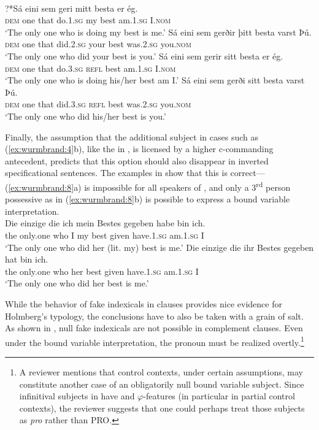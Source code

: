 \documentclass[output=paper]{LSP/langsci}
\begin{document}
\ea  \label{ex:wurmbrand:7}
\\
\ea
\gll  ?*Sá eini  sem  geri  mitt  besta  er  ég.\\
\textsc{dem} one  that  do.1.\textsc{sg}  my  best  am.1.\textsc{sg} I.\textsc{nom}\\
\glt ‘The only one who is doing my best is me.’
\ex
\gll  *Sá eini  sem  gerðir  þitt  besta  varst  Þú.\\
\textsc{dem} one  that  did.2.\textsc{sg}  your  best  was.2.\textsc{sg} you.\textsc{nom}\\
\glt  ‘The only one who did your best is you.’
\ex
\gll  Sá eini  sem  gerir  sitt  besta  er  ég.\\
\textsc{dem} one  that  do.3.\textsc{sg}  \textsc{refl}  best  am.1.\textsc{sg} I.\textsc{nom}\\
\glt  ‘The only one who is doing his/her best am I.’
\ex
\gll  Sá eini  sem  gerði  sitt  besta  varst  Þú.\\
\textsc{dem} one  that  did.3.\textsc{sg}  \textsc{refl}  best  was.2.\textsc{sg} you.\textsc{nom}\\
\glt  ‘The only one who did his/her best is you.’
\z
\z

Finally, the assumption that the additional subject in  cases such as (\ref{ex:wurmbrand:4}b), like the  in , is licensed by a higher c-commanding antecedent, predicts that this option should also disappear in inverted specificational sentences. The examples in  show that this is correct—(\ref{ex:wurmbrand:8}a) is impossible for all speakers of , and only a 3\textsuperscript{rd} person possessive as in (\ref{ex:wurmbrand:8}b) is possible to express a bound variable interpretation.
\newpage
\ea  \label{ex:wurmbrand:8}
 \\
\ea
\gll  *Die einzige  die  ich  mein Bestes  gegeben  habe  bin  ich.\\
the only.one  who  I  my best  given  have.1.\textsc{sg}  am.1.\textsc{sg}  I\\
\glt ‘The only one who did her (lit. my) best is me.’
\ex
\gll  Die einzige  die    ihr Bestes  gegeben  hat  bin  ich.\\
the only.one  who    her best  given  have.1.\textsc{sg}  am.1.\textsc{sg}  I\\
\glt  ‘The only one who did her best is me.’
\z
\z

While the behavior of fake indexicals in  clauses provides nice evidence for Holmberg’s  typology, the conclusions have to also be taken with a grain of salt. As shown in , null fake indexicals are not possible in complement clauses. Even under the bound variable interpretation, the pronoun must be realized overtly.\footnote{A reviewer mentions that control contexts, under certain assumptions, may constitute another case of an obligatorily null bound variable subject. Since infinitival subjects in  have  \citep{Sigurðsson1991} and $\varphi $-features (in particular in partial control contexts), the reviewer suggests that one could perhaps treat those subjects as \textit{pro} rather than PRO.}
\end{document}
